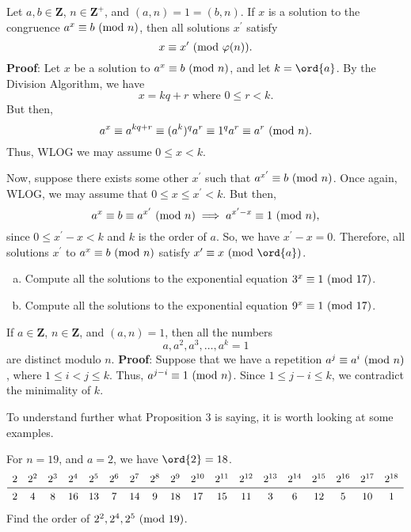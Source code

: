 \begin{Proposition}{}{}
    Let $ a,b\in\mathbf{Z} $, $ n\in\mathbf{Z}^+ $, and $ (a,n)=1=(b,n) $. If $ x $
    is a solution to the congruence $ a^x\equiv b\ (\mathrm{mod}\ n) $, then all solutions
    $ x^\prime $ satisfy
    \[ x\equiv x^\prime\ (\mathrm{mod}\ \varphi(n)). \]
    \tcblower{}
    \textbf{Proof}: Let $ x $ be a solution to $ a^x\equiv b\ (\mathrm{mod}\ n) $, and let $ k=\ord{a} $.
    By the Division Algorithm, we have
    \[ x=kq+r\text{ where }0\le r<k. \]
    But then,
    \[ a^x\equiv a^{kq+r}\equiv (a^k)^q a^r\equiv 1^q a^r\equiv a^r\ (\mathrm{mod}\ n). \]
    Thus, WLOG we may assume $ 0\le x<k $.

    Now, suppose there exists some other $ x^\prime $ such that $ a^{x^\prime}\equiv b\ (\mathrm{mod}\ n) $.
    Once again, WLOG, we may assume that $ 0\le x\le x^\prime<k $. But then,
    \[ a^x\equiv b\equiv a^{x^\prime}\ (\mathrm{mod}\ n)\implies a^{x^\prime-x} \equiv 1\ (\mathrm{mod}\ n), \]
    since $ 0\le x^\prime-x<k $ and $ k $ is the order of $ a $. So, we have $ x^\prime-x=0 $.
    Therefore, all solutions $ x^\prime $ to $ a^x\equiv b\ (\mathrm{mod}\ n) $ satisfy $ x^\prime\equiv x\Mod{\ord{a}} $.
\end{Proposition}
\begin{Example}{}{}
    \begin{enumerate}[(a)]
        \item Compute all the solutions to the exponential equation $ 3^x\equiv 1\ (\mathrm{mod}\ 17) $.
        \item Compute all the solutions to the exponential equation $ 9^x\equiv 1\ (\mathrm{mod}\ 17) $.
    \end{enumerate}
\end{Example}
\begin{Proposition}{}{}
    If $ a\in\mathbf{Z} $, $ n\in\mathbf{Z} $, and $ (a,n)=1 $, then all the numbers
    \[ a,a^2,a^3,\ldots,a^k=1 \]
    are distinct modulo $ n $.
    \tcblower{}
    \textbf{Proof}: Suppose that we have a repetition $ a^j\equiv a^i\ (\mathrm{mod}\ n) $, where $ 1\le i<j\le k $.
    Thus, $ a^{j-i}\equiv 1\ (\mathrm{mod}\ n) $. Since $ 1\le j-i\le k $, we contradict the minimality of $ k $.
\end{Proposition}
To understand further what Proposition 3 is saying, it is worth looking at some examples.
\begin{Example}{}{}
    For $ n=19 $, and $ a=2 $, we have $ \ord{2}=18 $.
    \[ \begin{array}{cccccccccccccccccc}
            2 & 2^2 & 2^3 & 2^4 & 2^5 & 2^6 & 2^7 & 2^8 & 2^9 & 2^{10} & 2^{11} & 2^{12} & 2^{13} & 2^{14} & 2^{15} & 2^{16} & 2^{17} & 2^{18} \\
            \midrule
            2 & 4   & 8   & 16  & 13  & 7   & 14  & 9   & 18  & 17     & 15     & 11     & 3      & 6      & 12     & 5      & 10     & 1
        \end{array} \]
    Find the order of $ 2^2,2^4,2^5\ (\mathrm{mod}\ 19) $.
\end{Example}
